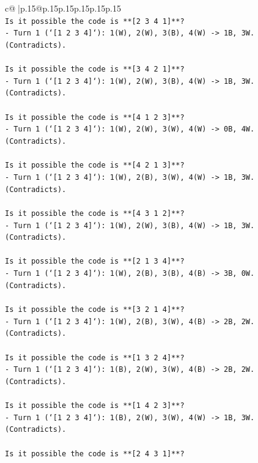 \documentclass{article}
\begin{document}
{\begin{supertabular}{c@{$\;$}|p{.15\linewidth}@{}p{.15\linewidth}p{.15\linewidth}p{.15\linewidth}p{.15\linewidth}p{.15\linewidth}}
{{{\\ 
\texttt{Is it possible the code is **{[}2 3 4 1{]}**?} \\
\texttt{{-} Turn 1 (`{[}1 2 3 4{]}`): 1(W), 2(W), 3(B), 4(W) {-}> 1B, 3W. (Contradicts).} \\
\\ 
\texttt{Is it possible the code is **{[}3 4 2 1{]}**?} \\
\texttt{{-} Turn 1 (`{[}1 2 3 4{]}`): 1(W), 2(W), 3(B), 4(W) {-}> 1B, 3W. (Contradicts).} \\
\\ 
\texttt{Is it possible the code is **{[}4 1 2 3{]}**?} \\
\texttt{{-} Turn 1 (`{[}1 2 3 4{]}`): 1(W), 2(W), 3(W), 4(W) {-}> 0B, 4W. (Contradicts).} \\
\\ 
\texttt{Is it possible the code is **{[}4 2 1 3{]}**?} \\
\texttt{{-} Turn 1 (`{[}1 2 3 4{]}`): 1(W), 2(B), 3(W), 4(W) {-}> 1B, 3W. (Contradicts).} \\
\\ 
\texttt{Is it possible the code is **{[}4 3 1 2{]}**?} \\
\texttt{{-} Turn 1 (`{[}1 2 3 4{]}`): 1(W), 2(W), 3(B), 4(W) {-}> 1B, 3W. (Contradicts).} \\
\\ 
\texttt{Is it possible the code is **{[}2 1 3 4{]}**?} \\
\texttt{{-} Turn 1 (`{[}1 2 3 4{]}`): 1(W), 2(B), 3(B), 4(B) {-}> 3B, 0W. (Contradicts).} \\
\\ 
\texttt{Is it possible the code is **{[}3 2 1 4{]}**?} \\
\texttt{{-} Turn 1 (`{[}1 2 3 4{]}`): 1(W), 2(B), 3(W), 4(B) {-}> 2B, 2W. (Contradicts).} \\
\\ 
\texttt{Is it possible the code is **{[}1 3 2 4{]}**?} \\
\texttt{{-} Turn 1 (`{[}1 2 3 4{]}`): 1(B), 2(W), 3(W), 4(B) {-}> 2B, 2W. (Contradicts).} \\
\\ 
\texttt{Is it possible the code is **{[}1 4 2 3{]}**?} \\
\texttt{{-} Turn 1 (`{[}1 2 3 4{]}`): 1(B), 2(W), 3(W), 4(W) {-}> 1B, 3W. (Contradicts).} \\
\\ 
\texttt{Is it possible the code is **{[}2 4 3 1{]}**?} \\
}}}
\end{supertabular}}
\end{document}

